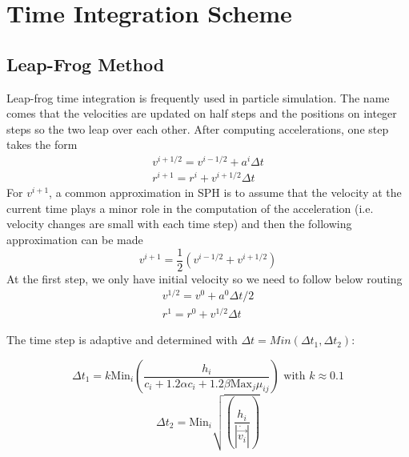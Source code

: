 \documentclass[notes.tex]{subfiles}
\begin{document}
\section{Time Integration Scheme}
\subsection{Leap-Frog Method}
Leap-frog time integration is frequently used in particle simulation. The name comes that the velocities are updated on half steps and the positions on integer steps so the two leap over each other. After computing accelerations, one step takes the form
\begin{align}
v^{i+1/2} = v^{i-1/2} + a^i \Delta t \\
r^{i+1} = r^i + v^{i+1/2} \Delta t
\end{align}
For $v^{i+1}$, a common approximation in SPH is to assume that the velocity at the current time plays a minor role in the computation of the acceleration (i.e. velocity changes are small with each time step) and then the following approximation can be made
\begin{equation}
v^{i+1} = \frac{1}{2} (v^{i-1/2}+v^{i+1/2})
\end{equation}
At the first step, we only have initial velocity so we need to follow below routing
\begin{align}
v^{1/2} = v^{0} + a^0 \Delta t/2 \\
r^{1} = r^0 + v^{1/2} \Delta t
\end{align}

The time step is adaptive and determined with $\Delta t = Min(\Delta t_1, \Delta t_2)$:

$$ \Delta t_1 = k \mbox{Min}_i(\frac{h_i}{c_i+1.2\alpha c_i + 1.2 \beta \mbox{Max}_j\mu_{ij}}) \mbox{ with } k \approx 0.1 $$
$$ \Delta t_2 = \mbox{Min}_i\sqrt{(\frac{h_i}{|\dot{\vec{v_i}}|})} $$
\end{document}
